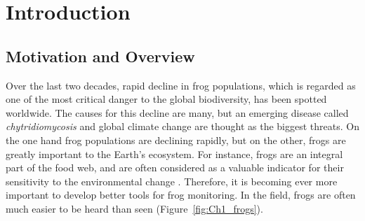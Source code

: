 
\chapter[Introduction]{Introduction}
\label{cha:cha1Introduction}
\section{Motivation and Overview}
Over the last two decades, rapid decline in frog populations, which is regarded as one of the most critical danger to the global biodiversity, has been spotted worldwide. The causes for this decline are many, but an emerging disease called \textit{chytridiomycosis}   \citep{mutschmann2015chytridiomycosis} and global climate change \citep{carey2003climate} are thought as the biggest threats. On the one hand frog populations are declining rapidly, but on the other, frogs are greatly important to the Earth's ecosystem. For instance, frogs are an integral part of the food web, and are often considered as a valuable indicator for their sensitivity to the environmental change \citep{boll2013amphibians}. Therefore, it is becoming ever more important to develop better tools for frog monitoring. 
In the field, frogs are often much easier to be heard than seen (Figure~\ref{fig:Ch1_frogs}). 


